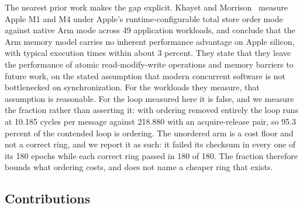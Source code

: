 \documentclass[conference]{IEEEtran}
\begin{document}
The nearest prior work makes the gap explicit. Khayet and
Morrison~\cite{khayet2026arm} measure Apple M1 and M4 under Apple's
runtime-configurable total store order mode against native Arm mode across 49
application workloads, and conclude that the Arm memory model carries no
inherent performance advantage on Apple silicon, with typical execution times
within about 3 percent. They state that they leave the performance of atomic
read-modify-write operations and memory barriers to future work, on the stated
assumption that modern concurrent software is not bottlenecked on
synchronization. For the workloads they measure, that assumption is reasonable.
For the loop measured here it is false, and we measure the fraction rather than
asserting it: with ordering removed entirely the loop runs at 10.185 cycles per
message against 218.880 with an acquire-release pair, so 95.3 percent of the
contended loop is ordering. The unordered arm is a cost floor and not a correct
ring, and we report it as such: it failed its checksum in every one of its 180
epochs while each correct ring passed in 180 of 180. The fraction therefore
bounds what ordering costs, and does not name a cheaper ring that exists.

\subsection{Contributions}
\end{document}
